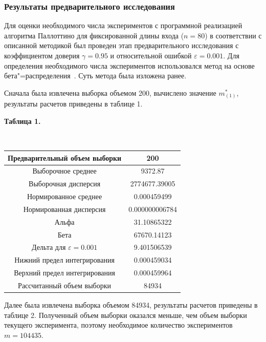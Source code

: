 \documentclass[a4paper, article, 12pt]{extarticle}
\begin{document}
\subsubsection{Результаты предварительного исследования}\label{subsec:results_part_1}

Для оценки необходимого числа экспериментов с программной реализацией алгоритма Паллоттино для фиксированной длины входа ($n = 80$) в соответствии с описанной методикой был проведен этап предварительного исследования с коэффициентом доверия $\gamma = 0.95$ и относительной ошибкой $\varepsilon = 0.001$. Для определения необходимого числа экспериментов использовался метод на основе бета"=распределения~\cite{petrushyn_ulyanov_planning}. Суть метода была изложена ранее.

Сначала была извлечена выборка объемом 200, вычислено значение $m_{(1)}^*$, результаты расчетов приведены в таблице 1.

\begin{center}\label{table1}
	\begin{small}
		\textbf{Таблица 1.}
	\end{small}\\
	\hfill \break
	\begin{tabular}{|c|c|}
		\hline
		Предварительный объем выборки & 200\\
		\hline
		Выборочное среднее & 9372.87\\
		\hline
		Выборочная дисперсия & 2774677.39005\\
		\hline
		Нормированное среднее & 0.000459499\\
		\hline
		Нормированная дисперсия & 0.000000006784\\
		\hline
		Альфа & 31.10865322\\
		\hline
		Бета & 67670.14123\\
		\hline
		Дельта для $\varepsilon = 0.001$ & 9.401506539\\
		\hline
		Нижний предел интегрирования & 0.000459034\\
		\hline
		Верхний предел интегрирования & 0.000459964\\
		\hline
		Рассчитанный объем выборки & 84934\\
		\hline
	\end{tabular}
\end{center}

Далее была извлечена выборка объемом 84934, результаты расчетов приведены в таблице 2. Полученный объем выборки оказался меньше, чем объем выборки текущего эксперимента, поэтому необходимое количество экспериментов $m = 104435$.
\end{document}
